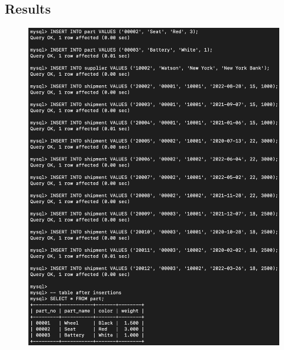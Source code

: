 \documentclass[12pt]{article}
\begin{document}
\subsection{Results}
\begin{figure}[!hbt]
    \centering
    \includegraphics[scale=0.65]{screenshots/4a.png}
    \label{fig:my_label1}
\end{figure}
\newpage
\end{document}
